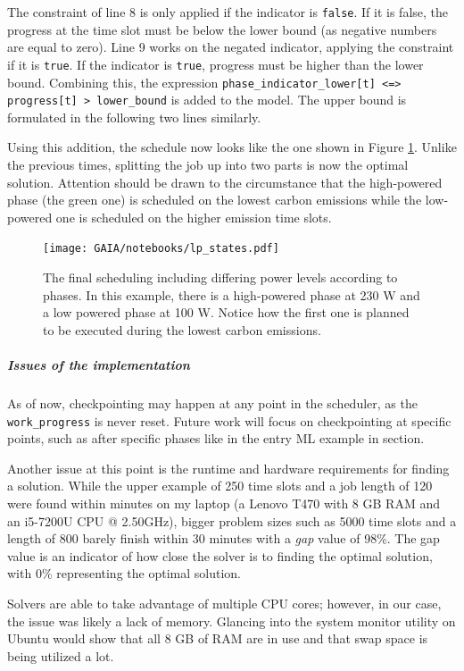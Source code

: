The constraint of line 8 is only applied if the indicator is \verb|false|.
If it is false, the progress at the time slot must be below the lower bound (as negative numbers are equal to zero).
Line 9 works on the negated indicator, applying the constraint if it is \verb|true|. 
If the indicator is \verb|true|, progress must be higher than the lower bound. 
Combining this, the expression \verb|phase_indicator_lower[t] <=> progress[t] > lower_bound| is added to the model. 
The upper bound is formulated in the following two lines similarly.

Using this addition, the schedule now looks like the one shown in Figure \ref{fig:lp_states}. 
Unlike the previous times, splitting the job up into two parts is now the optimal solution. 
Attention should be drawn to the circumstance that the high-powered phase (the green one) is scheduled on the lowest carbon emissions while the low-powered one is scheduled on the higher emission time slots.

\begin{figure}
    \texttt{[image: GAIA/notebooks/lp\_states.pdf]}
    \caption{The final scheduling including differing power levels according to phases. In this example, there is a high-powered phase at 230 W and a low powered phase at 100 W. Notice how the first one is planned to be executed during the lowest carbon emissions.}
    \label{fig:lp_states}
\end{figure}

\subparagraph{Issues of the implementation}

As of now, checkpointing may happen at any point in the scheduler, as the \verb|work_progress| is never reset. 
Future work will focus on checkpointing at specific points, such as after specific phases like in the entry ML example in section.

Another issue at this point is the runtime and hardware requirements for finding a solution.
While the upper example of 250 time slots and a job length of 120 were found within minutes on my laptop (a Lenovo T470 with 8 GB RAM and an i5-7200U CPU @ 2.50GHz), bigger problem sizes such as 5000 time slots and a length of 800 barely finish within 30 minutes with a \emph{gap} value of 98\%.
The gap value is an indicator of how close the solver is to finding the optimal solution, with 0\% representing the optimal solution.

Solvers are able to take advantage of multiple CPU cores; however, in our case, the issue was likely a lack of memory. 
Glancing into the system monitor utility on Ubuntu would show that all 8 GB of RAM are in use and that swap space is being utilized a lot.

